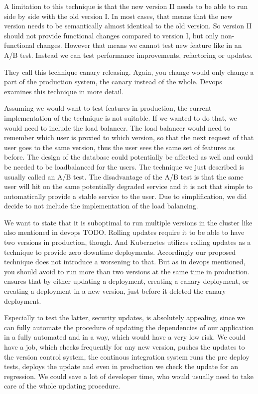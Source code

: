 A limitation to this technique is that the new version II needs to be able to run side by
side with the old version I. In most cases, that means that the new version needs to be
semantically almost identical to the old version. So version II should not provide
functional changes compared to version I, but only non-functional changes. However that
means we cannot test new feature like in an A/B test. Instead we can test performance
improvements, refactoring or updates.

They call this technique canary releasing. Again, you change would only change a part of
the production system, the canary instead of the whole. Devops~\cite{cd_humble_deploy}
examines this technique in more detail.

Assuming we would want to test features in production, the current implementation of the
technique is not suitable. If we wanted to do that, we would need to include the
load balancer. The load balancer would need to remember which user is proxied to which
version, so that the next request of that user goes to the same version, thus the user
sees the same set of features as before. The design of the database could potentially be
affected as well and could be needed to be loadbalanced for the users. The technique we
just described is usually called an A/B test. The disadvantage of the A/B test is that the
same user will hit on the same potentially degraded service and it is not that simple to
automatically provide a stable service to the user. Due to simplification, we did decide
to not include the implementation of the load balancing.

We want to state that it is suboptimal to run multiple versions in the cluster like also
mentioned in devops TODO. Rolling updates require it to be able to have two versions in
production, though. And Kubernetes utilizes rolling updates as a technique to provide zero
downtime deployments. Accordingly our proposed technique does not introduce a worsening to
that. But as in devops mentioned, you should avoid to run more than two versions at the
same time in production. \deployer ensures that by either updating a deployment, creating a
canary deployment, or creating a deployment in a new version, just before it deleted the
canary deployment.

Especially to test the latter, security updates, is absolutely appealing, since we can
fully automate the procedure of updating the dependencies of our application in a fully
automated and in a way, which would have a very low risk. We could have a job, which
checks frequently for any new version, pushes the updates to the version control system,
the continous integration system runs the pre deploy tests, \deployer deploys the update
and even in production we check the update for an regression. We could save a lot of
developer time, who would usually need to take care of the whole updating procedure.

